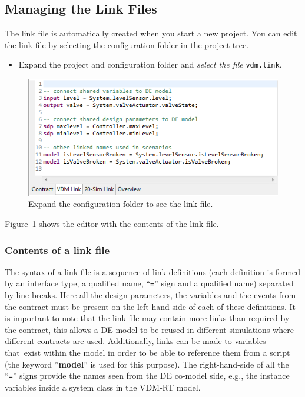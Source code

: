 \documentclass{crescendorepchap}
\newcommand{\vdmkeyw}[1]{{\bf\ttfamily #1}}
\begin{document}
\subsection{Managing the Link Files}

The link file is automatically created when you start a new project. You
can edit the link file by selecting the configuration folder in the
project tree.

\begin{itemize}
\item
  Expand the project and configuration folder and \emph{select the
  file} \texttt{vdm.link}.
\end{itemize}

\begin{figure}[htbp]
\centering
\includegraphics[width=.6\textwidth]{images/DestecsContractFile.png}
\caption{Expand the configuration folder to see the link file.\label{fig:linkfile}}
\end{figure}

Figure~\ref{fig:linkfile} shows the editor with the contents of the link file.

\subsubsection{Contents of a link file}

The syntax of a link file is a sequence of link definitions (each
definition is formed by an interface type, a qualified name, ``\texttt{=}'' sign
and a qualified name) separated by line breaks. Here all the design
parameters, the variables and the events from the contract must be
present on the left-hand-side of each of these definitions. It is
important to note that the link file may contain more links than
required by the contract, this allows a DE model to be reused in
different simulations where different contracts are used. Additionally,
links can be made to variables that~exist within the model in order to
be able to reference them from a script (the keyword ''\vdmkeyw{model}'' is used
for this purpose). The right-hand-side of all the ``\texttt{=}'' signs provide
the names seen from the DE co-model side, e.g., the instance variables
inside a system class in the VDM-RT model.
\end{document}
